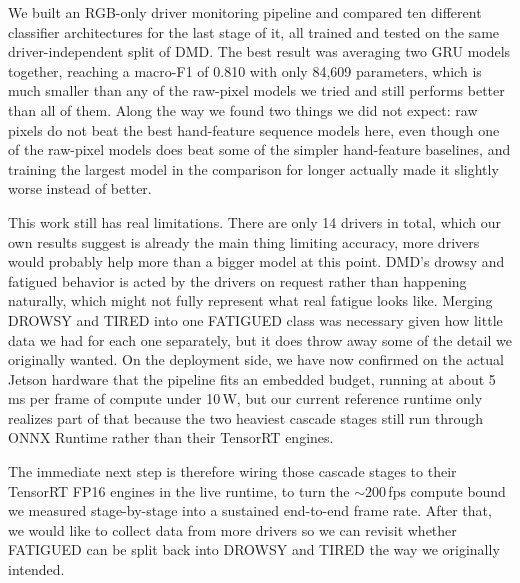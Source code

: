 \documentclass[conference]{IEEEtran}
\begin{document}
We built an RGB-only driver monitoring pipeline and compared ten different classifier architectures for the last stage of it, all trained and tested on the same driver-independent split of DMD. The best result was averaging two GRU models together, reaching a macro-F1 of 0.810 with only 84,609 parameters, which is much smaller than any of the raw-pixel models we tried and still performs better than all of them. Along the way we found two things we did not expect: raw pixels do not beat the best hand-feature sequence models here, even though one of the raw-pixel models does beat some of the simpler hand-feature baselines, and training the largest model in the comparison for longer actually made it slightly worse instead of better.

This work still has real limitations. There are only 14 drivers in total, which our own results suggest is already the main thing limiting accuracy, more drivers would probably help more than a bigger model at this point. DMD's drowsy and fatigued behavior is acted by the drivers on request rather than happening naturally, which might not fully represent what real fatigue looks like. Merging DROWSY and TIRED into one FATIGUED class was necessary given how little data we had for each one separately, but it does throw away some of the detail we originally wanted. On the deployment side, we have now confirmed on the actual Jetson hardware that the pipeline fits an embedded budget, running at about 5\,ms per frame of compute under 10\,W, but our current reference runtime only realizes part of that because the two heaviest cascade stages still run through ONNX Runtime rather than their TensorRT engines.

The immediate next step is therefore wiring those cascade stages to their TensorRT FP16 engines in the live runtime, to turn the ${\sim}200$\,fps compute bound we measured stage-by-stage into a sustained end-to-end frame rate. After that, we would like to collect data from more drivers so we can revisit whether FATIGUED can be split back into DROWSY and TIRED the way we originally intended.
\end{document}
